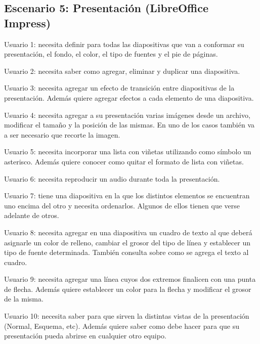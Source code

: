 \documentclass[12pt]{article}
\begin{document}
\subsection*{Escenario 5: Presentación (LibreOffice Impress)}

\begin{description}

    \item{Usuario 1}: necesita definir para todas las diapositivas que van a
    conformar su presentación, el fondo, el color, el tipo de fuentes y el pie
    de páginas.

    \item{Usuario 2}: necesita saber como agregar, eliminar y duplicar una
    diapositiva.

    \item{Usuario 3}: necesita agregar un efecto de transición entre
    diapositivas de la presentación. Además quiere agregar efectos a cada
    elemento de una diapositiva.

    \item{Usuario 4}: necesita agregar a su presentación varias imágenes desde
    un archivo, modificar el tamaño y la posición de las mismas. En uno de los
    casos también va a ser necesario que recorte la imagen.

    \item{Usuario 5}: necesita incorporar una lista con viñetas utilizando
    como símbolo un asterisco. Además quiere conocer como quitar el formato de
    lista con viñetas.

    \item{Usuario 6}: necesita reproducir un audio durante toda la
    presentación.

    \item{Usuario 7}: tiene una diapositiva en la que los distintos elementos
    se encuentran uno encima del otro y necesita ordenarlos. Algunos de ellos
    tienen que verse adelante de otros.

    \item{Usuario 8}: necesita agregar en una diapositiva un cuadro de texto
    al que deberá asignarle un color de relleno, cambiar el grosor del tipo de
    línea y establecer un tipo de fuente determinada. También consulta sobre
    como se agrega el texto al cuadro.

    \item{Usuario 9}: necesita agregar una línea cuyos dos extremos finalicen
    con una punta de flecha. Además quiere establecer un color para la flecha
    y modificar el grosor de la misma.

    \item{Usuario 10}: necesita saber para que sirven la distintas vistas de
    la presentación (Normal, Esquema, etc). Además quiere saber como debe
    hacer para que su presentación pueda abrirse en cualquier otro equipo.

\end{description}
\end{document}
